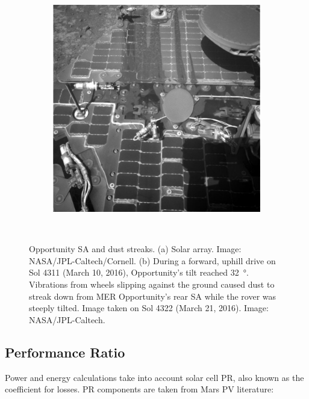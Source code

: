 \begin{figure}[h]
\begin{subfigure}[t]{\subfigureWidth}
            \includegraphics[height=\graphicsHeight]{sections/mars-solar-energy/photovoltaic-energy/images/mer-opportunity-dust-streaks.png}
            \label{fig:image:mer-opportunity-dust-streaks}
    \end{subfigure}\\[0.8ex]
    \caption[Opportunity solar arrays and dust streaks]
    {Opportunity \ac{SA} and dust streaks. (a) Solar array. Image: \ac{NASA}/\ac{JPL}-Caltech/Cornell. (b) During a forward, uphill drive on Sol 4311 (March 10, 2016), Opportunity's tilt reached \SI{32}{\degree}. Vibrations from wheels slipping against the ground caused dust to streak down from \ac{MER} Opportunity's rear \ac{SA} while the rover was steeply tilted. Image taken on Sol 4322 (March 21, 2016). Image: \ac{NASA}/\ac{JPL}-Caltech.}
    \label{fig:mer-solar-arrays-and-dust-streaks}
\vspace{-2ex}
\end{figure}


\subsection{Performance Ratio}
\label{sec:PowerAndEnergyPredictions:PerformanceRatio}
Power and energy calculations take into account solar cell \ac{PR}, also known as the coefficient for losses. \ac{PR} components are taken from Mars \ac{PV} literature:

